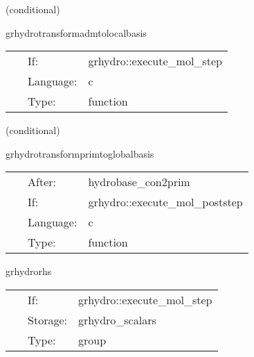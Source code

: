    (conditional) 

\hspace{5mm} grhydrotransformadmtolocalbasis 

\hspace{5mm}{\it transform metric and shift to local tensor basis. } 


\hspace{5mm}

 \begin{tabular*}{160mm}{cll} 
~ & If:  & grhydro::execute\_mol\_step \\ 
~ & Language:  & c \\ 
~ & Type:  & function \\ 
\end{tabular*} 


\vspace{5mm}

   (conditional) 

\hspace{5mm} grhydrotransformprimtoglobalbasis 

\hspace{5mm}{\it transform primitive vars to global tensor basis. } 


\hspace{5mm}

 \begin{tabular*}{160mm}{cll} 
~ & After:  & hydrobase\_con2prim \\ 
~ & If:  & grhydro::execute\_mol\_poststep \\ 
~ & Language:  & c \\ 
~ & Type:  & function \\ 
\end{tabular*} 


\vspace{5mm}


\hspace{5mm} grhydrorhs 

\hspace{5mm}{\it calculate the update terms } 


\hspace{5mm}

 \begin{tabular*}{160mm}{cll} 
~ & If:  & grhydro::execute\_mol\_step \\ 
~ & Storage:  & grhydro\_scalars \\ 
~ & Type:  & group \\ 
\end{tabular*} 


